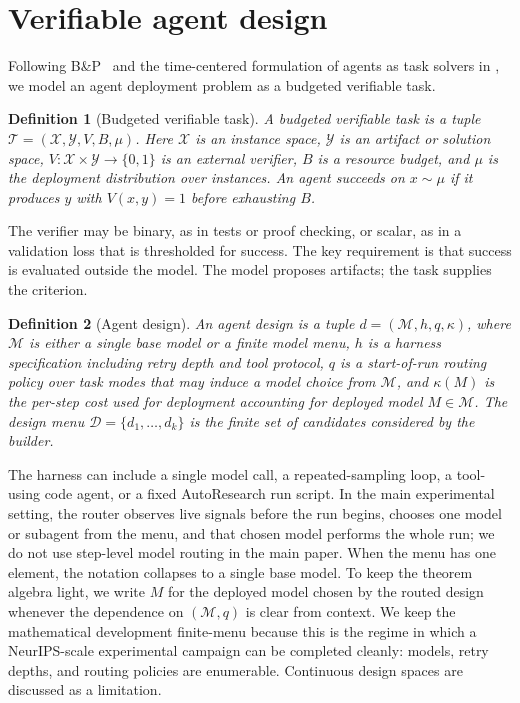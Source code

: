 \documentclass{article}
\newtheorem{definition}{Definition}
\newcommand{\cD}{\mathcal{D}}
\newcommand{\cT}{\mathcal{T}}
\newcommand{\cX}{\mathcal{X}}
\newcommand{\cY}{\mathcal{Y}}
\begin{document}
\section{Verifiable agent design}
\label{sec:setup}

Following B\&P~\citep{bp_task_definition_placeholder} and the time-centered formulation of agents as task solvers in \citet{achille2025agents}, we model an agent deployment problem as a budgeted verifiable task.

\begin{definition}[Budgeted verifiable task]
\label{def:task}
A budgeted verifiable task is a tuple
$\cT=(\cX,\cY,V,B,\mu)$.
Here $\cX$ is an instance space, $\cY$ is an artifact or solution space, $V:\cX\times\cY\to\{0,1\}$ is an external verifier, $B$ is a resource budget, and $\mu$ is the deployment distribution over instances.
An agent succeeds on $x\sim\mu$ if it produces $y$ with $V(x,y)=1$ before exhausting $B$.
\end{definition}

The verifier may be binary, as in tests or proof checking, or scalar, as in a validation loss that is thresholded for success.
The key requirement is that success is evaluated outside the model.
The model proposes artifacts; the task supplies the criterion.

\begin{definition}[Agent design]
\label{def:design}
An agent design is a tuple
$d=(\mathcal M,h,q,\kappa)$, where $\mathcal M$ is either a single base model or a finite model menu, $h$ is a harness specification including retry depth and tool protocol, $q$ is a start-of-run routing policy over task modes that may induce a model choice from $\mathcal M$, and $\kappa(M)$ is the per-step cost used for deployment accounting for deployed model $M\in\mathcal M$.
The design menu $\cD=\{d_1,\ldots,d_k\}$ is the finite set of candidates considered by the builder.
\end{definition}

The harness can include a single model call, a repeated-sampling loop, a tool-using code agent, or a fixed AutoResearch run script.
In the main experimental setting, the router observes live signals before the run begins, chooses one model or subagent from the menu, and that chosen model performs the whole run; we do not use step-level model routing in the main paper.
When the menu has one element, the notation collapses to a single base model.
To keep the theorem algebra light, we write $M$ for the deployed model chosen by the routed design whenever the dependence on $(\mathcal M,q)$ is clear from context.
We keep the mathematical development finite-menu because this is the regime in which a NeurIPS-scale experimental campaign can be completed cleanly: models, retry depths, and routing policies are enumerable.
Continuous design spaces are discussed as a limitation.
\end{document}
